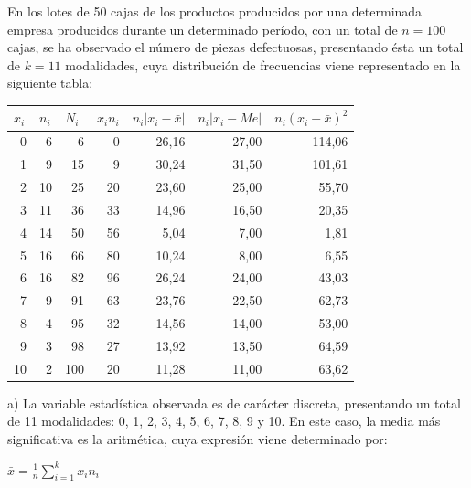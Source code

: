 En los lotes de 50 cajas de los productos producidos por una determinada empresa producidos durante un determinado período, con un total de $n = 100$ cajas, se ha observado el número de piezas defectuosas, presentando ésta un total de $k = 11$ modalidades, cuya distribución de frecuencias viene representado en la siguiente tabla:
\begin{center}
	\begin{table}[htbp]
		\begin{center}
			\begin{tabular}{|r|r|r|r|r|r|r|}
				\hline
				\multicolumn{1}{|l|}{$x_{i}$} & \multicolumn{1}{l|}{$n_{i}$} & \multicolumn{1}{l|}{$N_{i}$} &
				\multicolumn{1}{l|}{$x_{i}n_{i}$} & \multicolumn{1}{l|}{$n_{i}|x_{i} - \bar x|$} & \multicolumn{1}{l|}{$n_{i}|x_{i} - Me|$} & \multicolumn{1}{l|}{$n_{i}(x_{i} - \bar x)^2$} \\ \hline
				0 & 6 & 6 & 0 & 26,16 & 27,00 & 114,06 \\ \hline
				1 & 9 & 15 & 9 & 30,24 & 31,50 & 101,61 \\ \hline
				2 & 10 & 25 & 20 & 23,60 & 25,00 & 55,70 \\ \hline
				3 & 11 & 36 & 33 & 14,96 & 16,50 & 20,35 \\ \hline
				4 & 14 & 50 & 56 & 5,04 & 7,00 & 1,81 \\ \hline
				5 & 16 & 66 & 80 & 10,24 & 8,00 & 6,55 \\ \hline
				6 & 16 & 82 & 96 & 26,24 & 24,00 & 43,03 \\ \hline
				7 & 9 & 91 & 63 & 23,76 & 22,50 & 62,73 \\ \hline
				8 & 4 & 95 & 32 & 14,56 & 14,00 & 53,00 \\ \hline
				9 & 3 & 98 & 27 & 13,92 & 13,50 & 64,59 \\ \hline
				10 & 2 & 100 & 20 & 11,28 & 11,00 & 63,62 \\ \hline
			\end{tabular}
		\end{center}
	\end{table}	
	
\end{center}

a) La variable estadística observada es de carácter discreta, presentando un total de 11 modalidades: 0, 1, 2, 3, 4, 5, 6, 7, 8, 9 y 10. En este caso, la media más significativa es la aritmética, cuya expresión viene determinado por:

\begin{center}
	$\bar{x} = \frac{1}{n} \sum_{i=1}^{k}x_{i} n_{i}$ 
\end{center}

